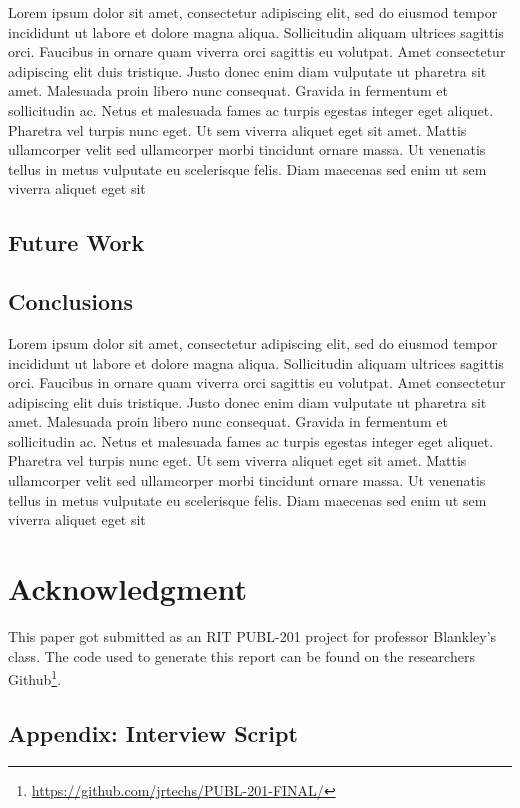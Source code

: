 \documentclass[12pt,
 reprint,
nofootinbib,
 amsmath,amssymb,
 aps,
floatfix,
]{revtex4-2}
\begin{document}
Lorem ipsum dolor sit amet, consectetur adipiscing elit, sed do eiusmod tempor incididunt ut labore et dolore magna aliqua. Sollicitudin aliquam ultrices sagittis orci. Faucibus in ornare quam viverra orci sagittis eu volutpat. Amet consectetur adipiscing elit duis tristique. Justo donec enim diam vulputate ut pharetra sit amet. Malesuada proin libero nunc consequat. Gravida in fermentum et sollicitudin ac. Netus et malesuada fames ac turpis egestas integer eget aliquet. Pharetra vel turpis nunc eget. Ut sem viverra aliquet eget sit amet. Mattis ullamcorper velit sed ullamcorper morbi tincidunt ornare massa. Ut venenatis tellus in metus vulputate eu scelerisque felis. Diam maecenas sed enim ut sem viverra aliquet eget sit

\subsection{Future Work}


\subsection{Conclusions}

Lorem ipsum dolor sit amet, consectetur adipiscing elit, sed do eiusmod tempor incididunt ut labore et dolore magna aliqua. Sollicitudin aliquam ultrices sagittis orci. Faucibus in ornare quam viverra orci sagittis eu volutpat. Amet consectetur adipiscing elit duis tristique. Justo donec enim diam vulputate ut pharetra sit amet. Malesuada proin libero nunc consequat. Gravida in fermentum et sollicitudin ac. Netus et malesuada fames ac turpis egestas integer eget aliquet. Pharetra vel turpis nunc eget. Ut sem viverra aliquet eget sit amet. Mattis ullamcorper velit sed ullamcorper morbi tincidunt ornare massa. Ut venenatis tellus in metus vulputate eu scelerisque felis. Diam maecenas sed enim ut sem viverra aliquet eget sit

\section{Acknowledgment}

This paper got submitted as an RIT PUBL-201 project for professor Blankley's class.
The code used to generate this report can be found on the researchers Github\footnote{\url{https://github.com/jrtechs/PUBL-201-FINAL/}}.

\subsection{\label{appendix:interview}Appendix: Interview Script}
\end{document}
